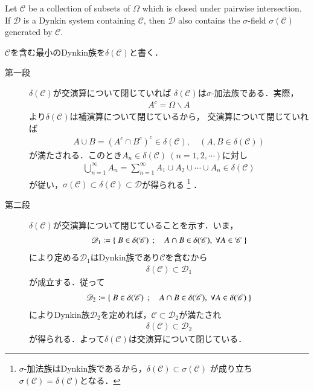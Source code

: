 \newpage
\begin{screen}	
	\begin{thm}
		Let $\mathscr{C}$ be a collection of subsets of $\Omega$ 
		which is closed under pairwise intersection. If $\mathscr{D}$ is 
		a Dynkin system containing $\mathscr{C}$, then $\mathscr{D}$ also 
		contains the $\sigma$-field $\sigma(\mathscr{C})$ generated by $\mathscr{C}$.
	\end{thm}
\end{screen}

\begin{prf}$\mathscr{C}$を含む最小のDynkin族を$\delta(\mathscr{C})$と書く．
	\begin{description}
		\item[第一段]
			$\delta(\mathscr{C})$が交演算について閉じていれば
			$\delta(\mathscr{C})$は$\sigma$-加法族である．実際，
			\begin{align}
				A^c = \Omega \backslash A
			\end{align}
			より$\delta(\mathscr{C})$は補演算について閉じているから，
			交演算について閉じていれば
			\begin{align}
				A \cup B = (A^c \cap B^c)^c \in \delta(\mathscr{C}),
				\quad \left( A,B \in \delta(\mathscr{C}) \right)
			\end{align}
			が満たされる．このとき$A_n \in \delta(\mathscr{C})\ (n=1,2,\cdots)$に対し
			\begin{align}
				\bigcup_{n=1}^{\infty} A_n
				= \sum_{n=1}^{\infty} A_1 \cup A_2 \cup \cdots \cup A_n
				\in \delta(\mathscr{C})
			\end{align}
			が従い，$\sigma(\mathscr{C}) \subset \delta(\mathscr{C}) \subset \mathscr{D}$が得られる
			\footnote{
				$\sigma$-加法族はDynkin族であるから，$\delta(\mathscr{C}) \subset \sigma(\mathscr{C})$
				が成り立ち$\sigma(\mathscr{C}) = \delta(\mathscr{C})$となる．
			}
			．
			
		\item[第二段]
			$\delta(\mathscr{C})$が交演算について閉じていることを示す．いま，
			\begin{align}
				\mathscr{D}_1 \coloneqq
				\Set{B \in \delta(\mathscr{C})}{ A \cap B \in \delta(\mathscr{C}),\ 
				\forall A \in \mathscr{C}}
			\end{align}
			により定める$\mathscr{D}_1$はDynkin族であり$\mathscr{C}$を含むから
			\begin{align}
				\delta(\mathscr{C}) \subset \mathscr{D}_1
			\end{align}
			が成立する．従って
			\begin{align}
				\mathscr{D}_2 \coloneqq
				\Set{B \in \delta(\mathscr{C})}{ A \cap B \in \delta(\mathscr{C}),\ 
				\forall A \in \delta(\mathscr{C})}
			\end{align}
			によりDynkin族$\mathscr{D}_2$を定めれば，$\mathscr{C} \subset \mathscr{D}_2$が満たされ
			\begin{align}
				\delta(\mathscr{C}) \subset \mathscr{D}_2
			\end{align}
			が得られる．よって$\delta(\mathscr{C})$は交演算について閉じている．
			\QED
	\end{description}
\end{prf}

